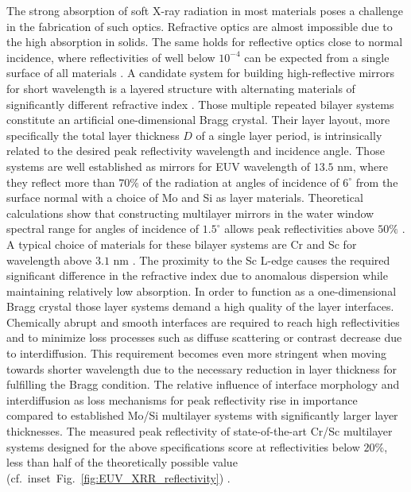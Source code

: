 \documentclass{iucr}              %
\begin{document}
The strong absorption of soft X-ray radiation in most materials poses a challenge in the fabrication of such optics. Refractive optics are almost impossible due to the high absorption in solids. The same holds for reflective optics close to normal incidence, where reflectivities of well below $10^{-4}$ can be expected from a single surface of all materials \cite{henke}. A candidate system for building high-reflective mirrors for short wavelength is a layered structure with alternating materials of significantly different refractive index \cite{SpillerMultilayer}. Those multiple repeated bilayer systems constitute an artificial one-dimensional Bragg crystal. Their layer layout, more specifically the total layer thickness $D$ of a single layer period, is intrinsically related to the desired peak reflectivity wavelength and incidence angle. Those systems are well established as mirrors for EUV wavelength of $13.5$ nm, where they reflect more than $70\%$ of the radiation at angles of incidence of $6^\circ$ from the surface normal with a choice of Mo and Si as layer materials. Theoretical calculations show that constructing multilayer mirrors in the water window spectral range for angles of incidence of $1.5^\circ$ allows peak reflectivities above $50\%$ \cite{Schafers:98}. A typical choice of materials for these bilayer systems are Cr and Sc for wavelength above $3.1$ nm \cite{Salashchenko19977, Schafers:98}. The proximity to the Sc L-edge causes the required significant difference in the refractive index due to anomalous dispersion while maintaining relatively low absorption. In order to function as a one-dimensional Bragg crystal those layer systems demand a high quality of the layer interfaces. Chemically abrupt and smooth interfaces are required to reach high reflectivities and to minimize loss processes such as diffuse scattering or contrast decrease due to interdiffusion. This requirement becomes even more stringent when moving towards shorter wavelength due to the necessary reduction in layer thickness for fulfilling the Bragg condition.
The relative influence of interface morphology and interdiffusion as loss mechanisms for peak reflectivity rise in importance compared to established Mo/Si multilayer systems with significantly larger layer thicknesses. The measured peak reflectivity of state-of-the-art Cr/Sc multilayer systems designed for the above specifications score at reflectivities below $20\%$, less than half of the theoretically possible value (cf.~inset~Fig.~\ref{fig:EUV_XRR_reflectivity}) \cite{Eriksson:03, doi:10.1117/12.505688}.
\end{document}

